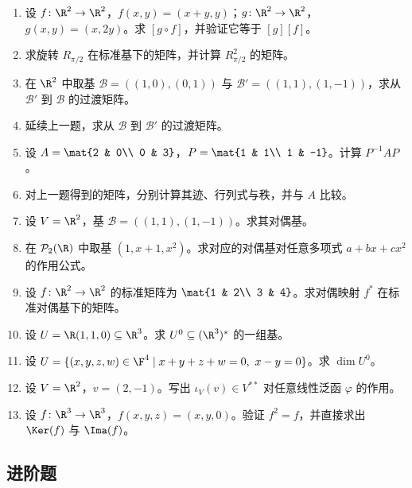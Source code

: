 \begin{enumerate}[label=\textbf{\arabic*.}, leftmargin=3.5em]
  \item {\basic} 设 $f\colon \R^2\to\R^2$，$f(x,y)=(x+y,y)$；$g\colon \R^2\to\R^2$，$g(x,y)=(x,2y)$。求 $[g\circ f]$，并验证它等于 $[g][f]$。
  \item {\basic} 求旋转 $R_{\pi/2}$ 在标准基下的矩阵，并计算 $R_{\pi/2}^2$ 的矩阵。
  \item {\basic} 在 $\R^2$ 中取基 $\mathcal B=((1,0),(0,1))$ 与 $\mathcal B'=((1,1),(1,-1))$，求从 $\mathcal B'$ 到 $\mathcal B$ 的过渡矩阵。
  \item {\basic} 延续上一题，求从 $\mathcal B$ 到 $\mathcal B'$ 的过渡矩阵。
  \item {\basic} 设 $A=\mat{2 & 0\\ 0 & 3}$，$P=\mat{1 & 1\\ 1 & -1}$。计算 $P^{-1}AP$。
  \item {\basic} 对上一题得到的矩阵，分别计算其迹、行列式与秩，并与 $A$ 比较。
  \item {\basic} 设 $V=\R^2$，基 $\mathcal B=((1,1),(1,-1))$。求其对偶基。
  \item {\basic} 在 $\mathcal P_2(\R)$ 中取基 $(1,x+1,x^2)$。求对应的对偶基对任意多项式 $a+bx+cx^2$ 的作用公式。
  \item {\basic} 设 $f\colon \R^2\to\R^2$ 的标准矩阵为 $\mat{1 & 2\\ 3 & 4}$。求对偶映射 $f^*$ 在标准对偶基下的矩阵。
  \item {\basic} 设 $U=\R(1,1,0)\subseteq \R^3$。求 $U^0\subseteq (\R^3)^*$ 的一组基。
  \item {\basic} 设 $U=\{(x,y,z,w)\in\F^4\mid x+y+z+w=0,\ x-y=0\}$。求 $\dim U^0$。
  \item {\basic} 设 $V=\R^2$，$v=(2,-1)$。写出 $\iota_V(v)\in V^{**}$ 对任意线性泛函 $\varphi$ 的作用。
  \item {\basic} 设 $f\colon \R^3\to\R^3$，$f(x,y,z)=(x,y,0)$。验证 $f^2=f$，并直接求出 $\Ker(f)$ 与 $\Ima(f)$。
\end{enumerate}

\subsection*{进阶题}

